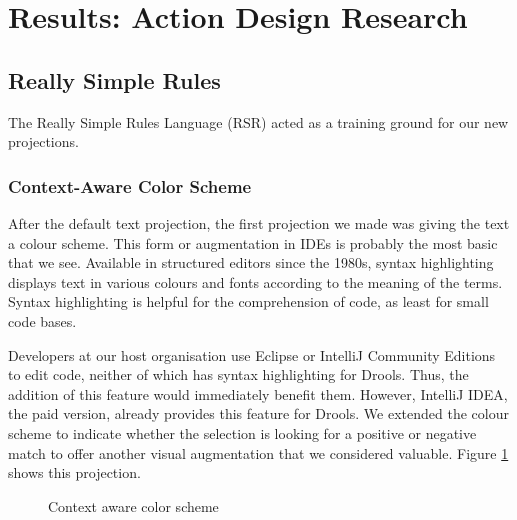 \section{Results: Action Design Research}\label{section:Results_ADR}

\subsection{Really Simple Rules}

The Really Simple Rules Language (RSR) acted as a training ground for our new projections.

\subsubsection{Context-Aware Color Scheme}
After the default text projection, the first projection we made was giving the text a colour scheme.
This form or augmentation in IDEs is probably the most basic that we see.
Available in structured editors since the 1980s\cite{cowlishaw1987lexx}, syntax highlighting displays text in various colours and fonts according to the meaning of the terms.
Syntax highlighting is helpful for the comprehension of code, as least for small code bases\cite{sarkar2015impact}.

Developers at our host organisation use Eclipse or IntelliJ Community Editions to edit code, neither of which has syntax highlighting for Drools. Thus, the addition of this feature would immediately benefit them.
However, IntelliJ IDEA, the paid version, already provides this feature for Drools.
We extended the colour scheme to indicate whether the selection is looking for a positive or negative match to offer another visual augmentation that we considered valuable.
Figure \ref{fig:colorscheme} shows this projection.

\begin{figure}[h]
    \centering
    \caption{Context aware color scheme}
    \label{fig:colorscheme}
\end{figure}

